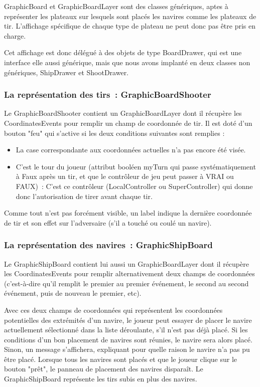 	GraphicBoard et GraphicBoardLayer sont des classes génériques, aptes à représenter les plateaux sur lesquels sont placés les navires comme les plateaux de tir. L'affichage spécifique de chaque type de plateau ne peut donc pas être pris en charge.\newline
	
	Cet affichage est donc délégué à des objets de type BoardDrawer, qui est une interface elle aussi générique, mais que nous avons implanté en deux classes non génériques, ShipDrawer et ShootDrawer.

\subsubsection{La représentation des tirs~: GraphicBoardShooter}

	Le GraphicBoardShooter contient un GraphicBoardLayer dont il récupère les CoordinatesEvents pour remplir un champ de coordonnée de tir.
Il est doté d'un bouton "feu" qui s'active si les deux conditions suivantes sont remplies :
\begin{itemize}
\item La case correspondante aux coordonnées actuelles n'a pas encore été visée.
\item C'est le tour du joueur (attribut booléen myTurn qui passe systématiquement à Faux après un tir, et que le contrôleur de jeu peut passer à VRAI ou FAUX)~: C'est ce contrôleur (LocalController ou SuperController) qui donne donc l'autorisation de tirer avant chaque tir.
\end{itemize}


Comme tout n'est pas forcément visible, un label indique la dernière coordonnée de tir et son effet sur l'adversaire (s'il a touché ou coulé un navire).

\subsubsection{La représentation des navires~: GraphicShipBoard}

	Le GraphicShipBoard contient lui aussi un GraphicBoardLayer dont il récupère les CoordinatesEvents pour remplir alternativement deux champs de coordonnées (c'est-à-dire qu'il remplit le premier au premier événement, le second au second événement, puis de nouveau le premier, etc). \newline
	
	Avec ces deux champs de coordonnées qui représentent les coordonnées potentielles des extrémités d'un navire, le joueur peut essayer de placer le navire actuellement sélectionné dans la liste déroulante, s'il n'est pas déjà placé.
Si les conditions d'un bon placement de navires sont réunies, le navire sera alors placé. Sinon, un message s'affichera, expliquant pour quelle raison le navire n'a pas pu être placé.
\newline
	Lorsque tous les navires sont placés et que le joueur clique sur le bouton "prêt", le panneau de placement des navires disparaît.
	Le GraphicShipBoard représente les tirs subis en plus des navires. \newline
	
